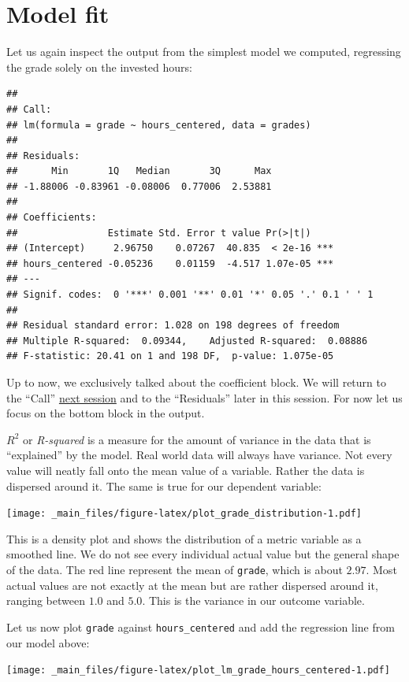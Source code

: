 \documentclass[
]{book}
\begin{document}
\hypertarget{model-fit}{%
\section{Model fit}\label{model-fit}}

Let us again inspect the output from the simplest model we computed, regressing the grade solely on the invested hours:

\begin{verbatim}
## 
## Call:
## lm(formula = grade ~ hours_centered, data = grades)
## 
## Residuals:
##      Min       1Q   Median       3Q      Max 
## -1.88006 -0.83961 -0.08006  0.77006  2.53881 
## 
## Coefficients:
##                Estimate Std. Error t value Pr(>|t|)    
## (Intercept)     2.96750    0.07267  40.835  < 2e-16 ***
## hours_centered -0.05236    0.01159  -4.517 1.07e-05 ***
## ---
## Signif. codes:  0 '***' 0.001 '**' 0.01 '*' 0.05 '.' 0.1 ' ' 1
## 
## Residual standard error: 1.028 on 198 degrees of freedom
## Multiple R-squared:  0.09344,    Adjusted R-squared:  0.08886 
## F-statistic: 20.41 on 1 and 198 DF,  p-value: 1.075e-05
\end{verbatim}

Up to now, we exclusively talked about the coefficient block. We will return to the ``Call'' \protect\hyperlink{lin-a}{next session} and to the ``Residuals'' later in this session. For now let us focus on the bottom block in the output.

\(R^2\) or \emph{R-squared} is a measure for the amount of variance in the data that is ``explained'' by the model. Real world data will always have variance. Not every value will neatly fall onto the mean value of a variable. Rather the data is dispersed around it. The same is true for our dependent variable:

\texttt{[image: \_main\_files/figure-latex/plot\_grade\_distribution-1.pdf]}

This is a density plot and shows the distribution of a metric variable as a smoothed line. We do not see every individual actual value but the general shape of the data. The red line represent the mean of \texttt{grade}, which is about \(2.97\). Most actual values are not exactly at the mean but are rather dispersed around it, ranging between \(1.0\) and \(5.0\). This is the variance in our outcome variable.

Let us now plot \texttt{grade} against \texttt{hours\_centered} and add the regression line from our model above:

\texttt{[image: \_main\_files/figure-latex/plot\_lm\_grade\_hours\_centered-1.pdf]}
\end{document}
